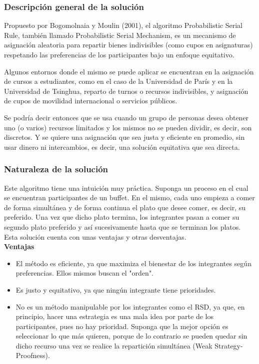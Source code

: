 \documentclass{article}
\begin{document}
\subsubsection{Descripción general de la solución}

Propuesto por Bogomolnaia y Moulin (2001), el algoritmo Probabilistic Serial Rule, también llamado 
Probabilistic Serial Mechanism, es un 
mecanismo de asignación aleatoria para repartir bienes indivisibles (como cupos en asignaturas) 
respetando las preferencias de los participantes bajo un enfoque equitativo.

Algunos entornos donde el mismo se puede aplicar se encuentran en la asignación de cursos a estudiantes,
como en el caso de la Universidad de París y en la Universidad de Tsinghua, reparto de turnos o 
recursos indivisibles, y asignación de cupos de movilidad internacional o servicios públicos.

Se podría decir entonces que se usa cuando un grupo de personas desea obtener uno (o varios) 
recursos limitados y los mismos no se pueden dividir, es decir, son discretos. Y se quiere una 
asignación que sea justa y eficiente en promedio, sin usar dinero ni intercambios, es decir, una 
solución equitativa que sea directa.

\subsubsection{Naturaleza de la solución}

Este algoritmo tiene una intuición muy práctica. Suponga un proceso en el cual se encuentran 
participantes de un buffet. En el mismo, cada uno empieza a comer de forma simultánea y de 
forma continua el plato que desee comer, es decir, su preferido. Una vez que dicho plato termina,
los integrantes pasan a comer su segundo plato preferido y así sucesivamente hasta que se terminan 
los platos.\\

Esta solución cuenta con unas ventajas y otras desventajas.\\

\textbf{Ventajas}

\begin{itemize}
  \item El método es eficiente, ya que maximiza el bienestar de los integrantes según preferencias.
        Ellos mismos buscan el "orden".
  \item Es justo y equitativo, ya que ningún integrante tiene prioridades.
  \item No es un método manipulable por los integrantes como el RSD, ya que, en principio, hacer una 
        estrategia es una mala idea por parte de los participantes, pues no hay prioridad. Suponga que
        la mejor opción es seleccionar lo que más quieren, porque de lo contrario se pueden quedar sin 
        dicho recurso una vez se realice la repartición simultánea (Weak Strategy-Proofness).
\end{itemize}
\end{document}
